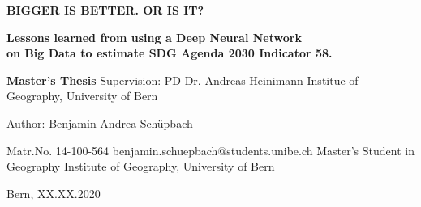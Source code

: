 
	

\clearpage
\thispagestyle{empty}
\setlength{\hoffset}{-20mm}




\begin{tcolorbox}[standard jigsaw, colback=black, opacityback=1, width=620, opacityframe=0, coltext=white]
	

	{\Huge \textbf{BIGGER IS BETTER. OR IS IT?}}\bigbreak



		\textbf{{\Large Lessons learned from using a Deep Neural Network\\ on Big Data to estimate SDG Agenda 2030 Indicator 58.}}



\end{tcolorbox}


\vspace{4cm}

\begin{tcolorbox}[standard jigsaw, colback=black, opacityback=0, width=280, opacityframe=0, coltext=white, halign=20]
{	
	\smallbreak
	
	\large 
	\textbf{Master's Thesis}
	\smallbreak
	Supervision: \bigbreak
	PD Dr. Andreas Heinimann\bigbreak
	Institue of Geography, University of Bern\bigbreak\bigbreak
	
	
	Author:\bigbreak	
	Benjamin Andrea Schüpbach \bigbreak
	
	Matr.No. 14-100-564\smallbreak
	benjamin.schuepbach@students.unibe.ch\smallbreak
	Master's Student in Geography\smallbreak
	Institute of Geography, University of Bern\bigbreak
	

	Bern, XX.XX.2020


}
\end{tcolorbox}


\clearpage
\setlength{\hoffset}{0mm}





\newpage